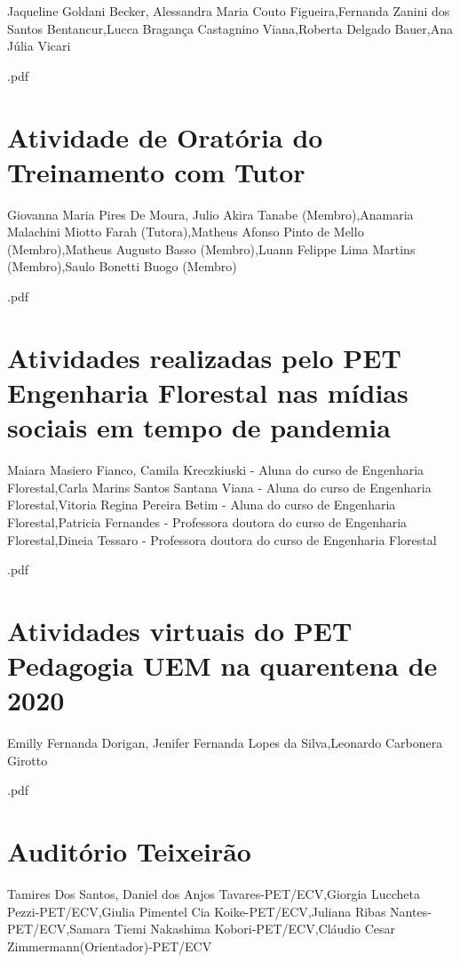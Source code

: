Jaqueline Goldani Becker, Alessandra Maria Couto Figueira,Fernanda Zanini dos Santos Bentancur,Lucca Bragança Castagnino Viana,Roberta Delgado Bauer,Ana Júlia Vicari



.pdf\section{Atividade de Oratória do Treinamento com Tutor}

Giovanna Maria Pires De Moura, Julio Akira Tanabe (Membro),Anamaria Malachini Miotto Farah (Tutora),Matheus Afonso Pinto de Mello (Membro),Matheus Augusto Basso (Membro),Luann Felippe Lima Martins (Membro),Saulo Bonetti Buogo (Membro)



.pdf\section{Atividades realizadas pelo PET Engenharia Florestal nas mídias sociais em tempo de pandemia}

Maiara Masiero Fianco, Camila Kreczkiuski - Aluna do curso de Engenharia Florestal,Carla Marins Santos Santana Viana - Aluna do curso de Engenharia Florestal,Vitoria Regina Pereira Betim - Aluna do curso de Engenharia Florestal,Patricia Fernandes - Professora doutora do curso de Engenharia Florestal,Dineia Tessaro - Professora doutora do curso de Engenharia Florestal



.pdf\section{Atividades virtuais do PET Pedagogia UEM na quarentena de 2020}

Emilly Fernanda Dorigan, Jenifer Fernanda Lopes da Silva,Leonardo Carbonera Girotto



.pdf\section{Auditório Teixeirão}

Tamires Dos Santos, Daniel dos Anjos Tavares-PET/ECV,Giorgia Luccheta Pezzi-PET/ECV,Giulia Pimentel Cia Koike-PET/ECV,Juliana Ribas Nantes-PET/ECV,Samara Tiemi Nakashima Kobori-PET/ECV,Cláudio Cesar Zimmermann(Orientador)-PET/ECV

